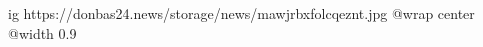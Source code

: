  
 
 
 
 

\ifcmt
  ig https://donbas24.news/storage/news/mawjrbxfolcqeznt.jpg
  @wrap center
  @width 0.9
\fi
